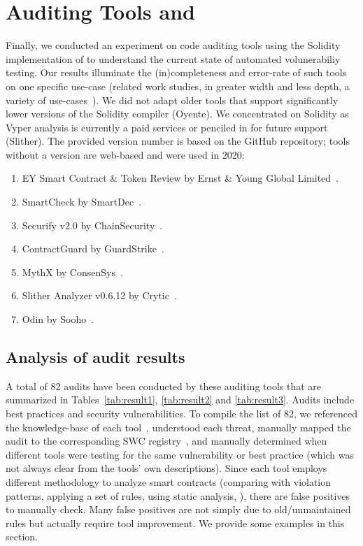 




\section{Auditing Tools and \erc}\label{sec:tools}
Finally, we conducted an experiment on code auditing tools using the Solidity implementation of \sys to understand the current state of automated volunerabiliy testing. Our results illuminate the (in)completeness and error-rate of such tools on one specific use-case (related work studies, in greater width and less depth, a variety of use-cases~\cite{AuditTools}). We did not adapt older tools that support significantly lower versions of the Solidity compiler (\eg Oyente). We concentrated on Solidity as Vyper analysis is currently a paid services or penciled in for future support (\eg Slither). The provided version number is based on the GitHub repository; tools without a version are web-based and were used in 2020:

\begin{enumerate}
	\item EY Smart Contract \& Token Review by Ernst \& Young Global Limited~\cite{EYTool}.
	\item SmartCheck by SmartDec~\cite{SMARTCHECK}.
	\item Securify v2.0 by ChainSecurity~\cite{SECURIFYGIT,SECURIFY}.
	\item ContractGuard by GuardStrike~\cite{ContractGuard}.
	\item MythX by ConsenSys~\cite{MythX}.
	\item Slither Analyzer v0.6.12 by Crytic~\cite{SlitherDoc}.
	\item Odin by Sooho~\cite{Odin}.
\end{enumerate}

\subsection{Analysis of audit results}
A total of 82 audits have been conducted by these auditing tools that are summarized in Tables~\ref{tab:result1}, \ref{tab:result2} and \ref{tab:result3}. Audits include best practices and security vulnerabilities. To compile the list of 82, we referenced the knowledge-base of each tool~\cite{SECURIFYGIT,SMARTCHECK,MythX,ContractGuard,SlitherDoc}, understood each threat, manually mapped the audit to the corresponding SWC registry~\cite{SWC}, and manually determined when different tools were testing for the same vulnerability or best practice (which was not always clear from the tools' own descriptions). Since each tool employs different methodology to analyze smart contracts (\eg comparing with violation patterns, applying a set of rules, using static analysis, \etc), there are false positives to manually check. Many false positives are not simply due to old/unmaintained rules but actually require tool improvement. We provide some examples in this section.

